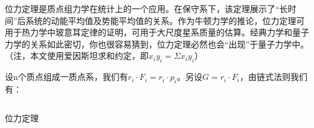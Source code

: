 位力定理是质点组力学在统计上的一个应用。在保守系下，该定理展示了“长时间”后系统的动能平均值及势能平均值的关系。作为牛顿力学的推论，位力定理可用于热力学中玻意耳定律的证明，可用于大尺度星系质量的估算。经典力学和量子力学的关系如此密切，你也很容易猜到，位力定理必然也会“出现”于量子力学中。（注，本文使用爱因斯坦求和约定，即$x_iy_i=\Sigma x_iy_i$）

设n个质点组成一质点系，我们有$r_i\cdot F_i=r_i\cdot p_i$。另设$G=r_i\cdot F_i$，由链式法则我们有：

\begin{equation}

\end{equation}

\begin{theorem}{位力定理}

\end{theorem}
